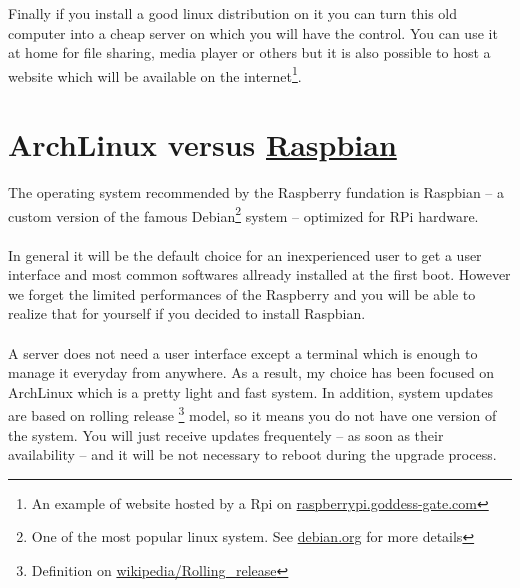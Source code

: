 Finally if you install a good linux distribution on it you can turn this old computer
into a cheap server on which you will have the control. You can use it 
at home for file sharing, media player or others but it is also possible
to host a website which will be available on the internet\footnote{An example
of website hosted by a Rpi on \href{http://raspberrypi.goddess-gate.com}
{raspberrypi.goddess-gate.com}}.

	\section{ArchLinux versus \href{http://www.raspbian.org}{Raspbian}}
The operating system recommended by the Raspberry fundation is Raspbian -- a custom version of the famous Debian\footnote{One of the most popular linux 
system. See \href{https://www.debian.org/intro/about}{debian.org} for more details} system -- optimized for RPi hardware. 
\\\\
In general it will be the default choice for an inexperienced user to get
a user interface and most common softwares allready installed at the first boot.
However we forget the limited performances of the Raspberry and you will be able to realize that for yourself if you decided to install Raspbian. 
\\\\
A server does not need a user interface except a terminal which is enough 
to manage it everyday from anywhere. As a result, my choice has been focused 
on ArchLinux which is a pretty light and fast system. In addition, system 
updates are based on rolling release \footnote{Definition on \href{http://
en.wikipedia.org/wiki/Rolling\_release}{wikipedia/Rolling\_release}} model, 
so it means you do not have one version of the system. You will just receive 
updates frequentely -- as soon as their availability -- and it will be not 
necessary to reboot during the upgrade process.
